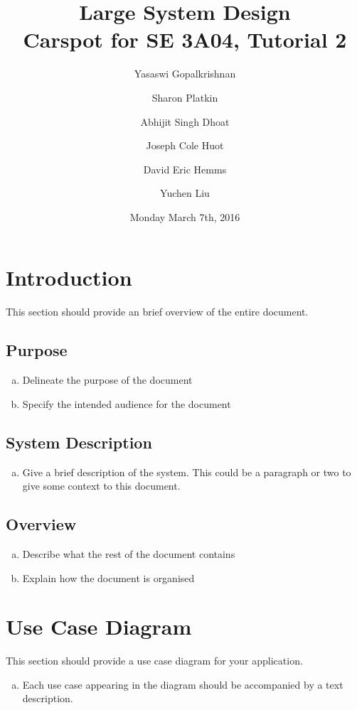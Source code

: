 \documentclass[12pt]{article}
\title{Large System Design\\
	\large Carspot for SE 3A04, Tutorial 2}
\author{
         Yasaswi Gopalkrishnan\\ \newline
         \and
         Sharon Platkin \\ \newline
         \and
         Abhijit Singh Dhoat\\ \newline
         \and
         Joseph Cole Huot\\ \newline
         \and
         David Eric Hemms\\ \newline
         \and
         Yuchen Liu\\ \newline
    }
\date{Monday March 7th, 2016}
\begin{document}
\maketitle
\newpage
\tableofcontents
\listoftables
\newpage

\section{Introduction}
\label{sec:introduction}

This section should provide an brief overview of the entire document.

\subsection{Purpose}
\label{sub:purpose}
\begin{enumerate}[a)]
	\item Delineate the purpose of the document
	\item Specify the intended audience for the document
\end{enumerate}

\subsection{System Description}
\label{sub:system_description}
\begin{enumerate}[a)]
	\item Give a brief description of the system. This could be a paragraph or two to give some context to this document.
\end{enumerate}

\subsection{Overview}
\label{sub:overview}
\begin{enumerate}[a)]
	\item Describe what the rest of the document contains
	\item Explain how the document is organised
\end{enumerate}


\section{Use Case Diagram}
\label{sec:use_case_diagram}
This section should provide a use case diagram for your application.
\begin{enumerate}[a)]
	\item Each use case appearing in the diagram should be accompanied by a text description.
\end{enumerate}
\end{document}

